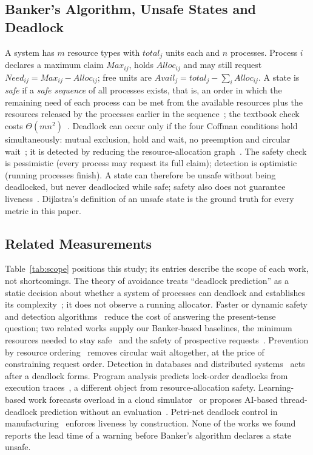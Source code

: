 \documentclass[conference]{IEEEtran}
\begin{document}
\subsection{Banker's Algorithm, Unsafe States and Deadlock}\label{sec:bg-banker}
A system has $m$ resource types with $\mathit{total}_j$ units each and $n$ processes. Process $i$ declares a maximum claim $\mathit{Max}_{ij}$, holds $\mathit{Alloc}_{ij}$ and may still request $\mathit{Need}_{ij}=\mathit{Max}_{ij}-\mathit{Alloc}_{ij}$; free units are $\mathit{Avail}_j=\mathit{total}_j-\sum_i\mathit{Alloc}_{ij}$. A state is \emph{safe} if a \emph{safe sequence} of all processes exists, that is, an order in which the remaining need of each process can be met from the available resources plus the resources released by the processes earlier in the sequence~\cite{Dijkstra-EWD623,Habermann1969}; the textbook check costs $\Theta(mn^2)$~\cite{Silberschatz2018,Tanenbaum2022,Belik1987}. Deadlock can occur only if the four Coffman conditions hold simultaneously: mutual exclusion, hold and wait, no preemption and circular wait~\cite{Coffman1971}; it is detected by reducing the resource-allocation graph~\cite{Holt1972}. The safety check is pessimistic (every process may request its full claim); detection is optimistic (running processes finish). A state can therefore be unsafe without being deadlocked, but never deadlocked while safe; safety also does not guarantee liveness~\cite{Holt1971,ParnasHabermann1972}. Dijkstra's definition of an unsafe state is the ground truth for every metric in this paper.

\subsection{Related Measurements}\label{sec:bg-related}
Table~\ref{tab:scope} positions this study; its entries describe the scope of each work, not shortcomings. The theory of avoidance treats ``deadlock prediction'' as a static decision about whether a system of processes can deadlock and establishes its complexity~\cite{Gold1978,Minoura1982,Kameda1980}; it does not observe a running allocator. Faster or dynamic safety and detection algorithms~\cite{Belik1987,Finkel1987,LiCook2007,Lang1999,Zohora2024} reduce the cost of answering the present-tense question; two related works supply our Banker-based baselines, the minimum resources needed to stay safe~\cite{Finkel1987} and the safety of prospective requests~\cite{AndrewsLevin1982}. Prevention by resource ordering~\cite{Havender1968} removes circular wait altogether, at the price of constraining request order. Detection in databases and distributed systems~\cite{Agrawal1983,Chandy1983,Knapp1987,Singhal1989} acts after a deadlock forms. Program analysis predicts lock-order deadlocks from execution traces~\cite{Bensalem2006,Joshi2009,Kalhauge2018,Tunc2023}, a different object from resource-allocation safety. Learning-based work forecasts overload in a cloud simulator~\cite{LeNgoc2023} or proposes AI-based thread-deadlock prediction without an evaluation~\cite{Oluwaseyi2024}. Petri-net deadlock control in manufacturing~\cite{Banaszak1990,Ezpeleta1995,Fanti2004,Li2008} enforces liveness by construction. None of the works we found reports the lead time of a warning before Banker's algorithm declares a state unsafe.
\end{document}
